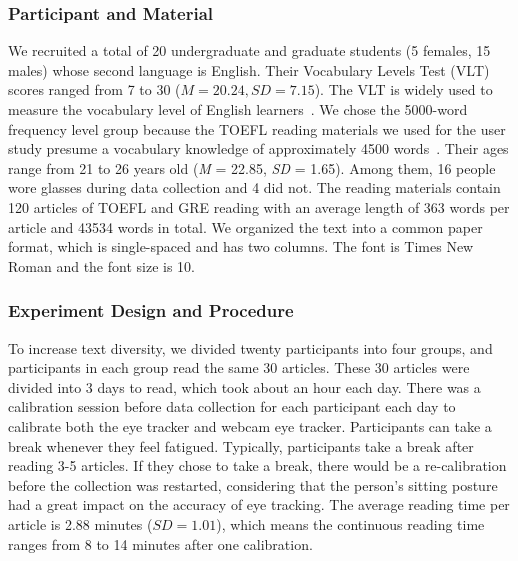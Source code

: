 \subsubsection{Participant and Material}
We recruited a total of 20 undergraduate and graduate students (5 females, 15 males) whose second language is English. Their Vocabulary Levels Test (VLT) scores ranged from 7 to 30 ($M = 20.24, SD = 7.15$). The VLT is widely used to measure the vocabulary level of English learners~\cite{nation1990teaching,schmitt2001developing}. We chose the 5000-word frequency level group because the TOEFL reading materials we used for the user study presume a vocabulary knowledge of approximately 4500 words~\cite{chujo2009many}. Their ages range from 21 to 26 years old (\textit{M} = 22.85, \textit{SD} = 1.65).
Among them, 16 people wore glasses during data collection and 4 did not.
The reading materials contain 120 articles of TOEFL and GRE reading with an average length of 363 words per article and 43534 words in total. We organized the text into a common paper format, which is single-spaced and has two columns. The font is Times New Roman and the font size is 10.

\subsubsection{Experiment Design and Procedure}
\label{sec:method_procedure}
To increase text diversity, we divided twenty participants into four groups, and participants in each group read the same 30 articles. These 30 articles were divided into 3 days to read, which took about an hour each day. There was a calibration session before data collection for each participant each day to calibrate both the eye tracker and webcam eye tracker. Participants can take a break whenever they feel fatigued. Typically, participants take a break after reading 3-5 articles. If they chose to take a break, there would be a re-calibration before the collection was restarted, considering that the person's sitting posture had a great impact on the accuracy of eye tracking. The average reading time per article is 2.88 minutes ($SD = 1.01$), which means the continuous reading time ranges from 8 to 14 minutes after one calibration.

